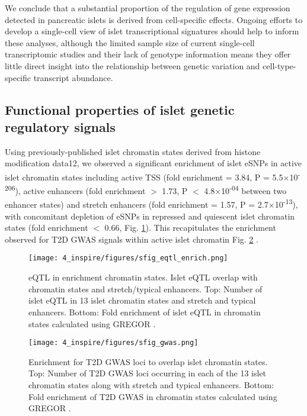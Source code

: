 We conclude that a substantial proportion of the regulation of gene expression detected in pancreatic islets is derived from cell-specific effects. Ongoing efforts to develop a single-cell view of islet transcriptional signatures should help to inform these analyses, although the limited sample size of current single-cell transcriptomic studies \cite{wangSingleCellTranscriptomics2016} and their lack of genotype information means they offer little direct insight into the relationship between genetic variation and cell-type-specific transcript abundance. 

\subsection{Functional properties of islet genetic regulatory signals} 	
Using previously-published islet chromatin states derived from histone modification data12, we observed a significant enrichment of islet eSNPs in active islet chromatin states including active TSS (fold enrichment = 3.84, P = 5.5$\times$10\textsuperscript{-206}), active enhancers (fold enrichment $>$ 1.73, P $<$ 4.8$\times$10\textsuperscript{-04} between two enhancer states) and stretch enhancers (fold enrichment = 1.57, P = 2.7$\times$10\textsuperscript{-13}), with concomitant depletion of eSNPs in repressed and quiescent islet chromatin states (fold enrichment $<$ 0.66, Fig. \ref{fig:c4_sf_eqtl_enrich}). This recapitulates the enrichment observed for T2D GWAS signals within active islet chromatin Fig. \ref{fig:c4_sf_gwas} \cite{parkerChromatinStretchEnhancer2013, pasqualiPancreaticIsletEnhancer2014, varshneyGeneticRegulatorySignatures2017, thurnerIntegrationHumanPancreatic2018}.

\begin{figure}
    \centering
    \texttt{[image: 4\_inspire/figures/sfig\_eqtl\_enrich.png]}
    \caption[eQTL in enrichment islet chromatin states]{eQTL in enrichment chromatin states. Islet eQTL overlap with chromatin states and stretch/typical enhancers. Top: Number of islet eQTL in 13 islet chromatin states and stretch and typical enhancers. Bottom: Fold enrichment of islet eQTL in chromatin states calculated using GREGOR \cite{schmidtGREGOREvaluatingGlobal2015}.}
    \label{fig:c4_sf_eqtl_enrich}
\end{figure}

\begin{figure}
    \centering
    \texttt{[image: 4\_inspire/figures/sfig\_gwas.png]}
    \caption[T2D GWAS enrichment in islet chromatin states.]{Enrichment for T2D GWAS loci to overlap islet chromatin states. Top: Number of T2D GWAS loci occurring in each of the 13 islet chromatin states along with stretch and typical enhancers. Bottom: Fold enrichment of T2D GWAS in chromatin states calculated using GREGOR \cite{schmidtGREGOREvaluatingGlobal2015}.}
    \label{fig:c4_sf_gwas}
\end{figure}
  
